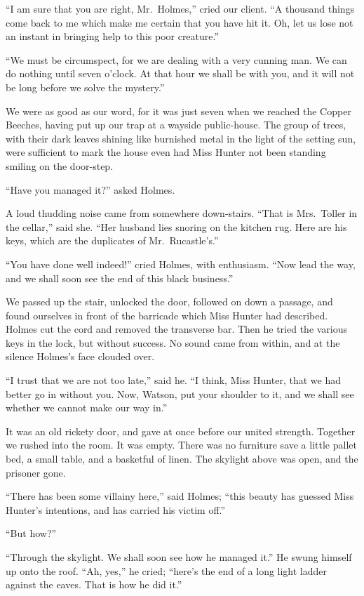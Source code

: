 “I am sure that you are right, Mr.~Holmes,” cried our client.
“A thousand things come back to me which make me certain
that you have hit it. Oh, let us lose not an instant in bringing
help to this poor creature.”

“We must be circumspect, for we are dealing with a very
cunning man. We can do nothing until seven o’clock. At
that hour we shall be with you, and it will not be long before
we solve the mystery.”

We were as good as our word, for it was just seven when we
reached the Copper Beeches, having put up our trap at a wayside
public-house. The group of trees, with their dark leaves
shining like burnished metal in the light of the setting sun,
were sufficient to mark the house even had Miss Hunter not
been standing smiling on the door-step.

“Have you managed it?” asked Holmes.

A loud thudding noise came from somewhere down-stairs.
“That is Mrs.~Toller in the cellar,” said she. “Her husband
lies snoring on the kitchen rug. Here are his keys, which are
the duplicates of Mr.~Rucastle’s.”

“You have done well indeed!” cried Holmes, with enthusiasm.
“Now lead the way, and we shall soon see the end of
this black business.”

We passed up the stair, unlocked the door, followed on
down a passage, and found ourselves in front of the barricade
which Miss Hunter had described. Holmes cut the cord and
removed the transverse bar. Then he tried the various keys
in the lock, but without success. No sound came from within,
and at the silence Holmes’s face clouded over.

“I trust that we are not too late,” said he. “I think, Miss
Hunter, that we had better go in without you. Now, Watson,
put your shoulder to it, and we shall see whether we cannot
make our way in.”

It was an old rickety door, and gave at once before our
united strength. Together we rushed into the room. It was
empty. There was no furniture save a little pallet bed, a
small table, and a basketful of linen. The skylight above was
open, and the prisoner gone.

“There has been some villainy here,” said Holmes; “this
beauty has guessed Miss Hunter’s intentions, and has carried
his victim off.”

“But how?”

“Through the skylight. We shall soon see how he managed
it.” He swung himself up onto the roof. “Ah, yes,”
he cried; “here’s the end of a long light ladder against the
eaves. That is how he did it.”

